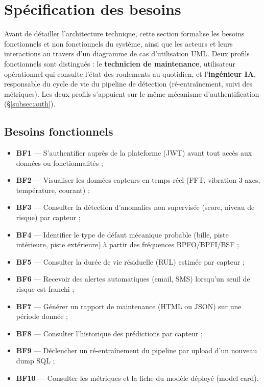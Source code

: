 \documentclass[12pt,a4paper]{report}
\begin{document}
\section{Spécification des besoins}

Avant de détailler l'architecture technique, cette section formalise les besoins
fonctionnels et non fonctionnels du système, ainsi que les acteurs et leurs interactions
au travers d'un diagramme de cas d'utilisation UML. Deux profils fonctionnels sont
distingués : le \textbf{technicien de maintenance}, utilisateur opérationnel qui consulte
l'état des roulements au quotidien, et l'\textbf{ingénieur IA}, responsable du cycle de
vie du pipeline de détection (ré-entraînement, suivi des métriques). Les deux profils
s'appuient sur le même mécanisme d'authentification (\S\ref{subsec:auth}).

\subsection{Besoins fonctionnels}

\begin{itemize}
  \item \textbf{BF1} — S'authentifier auprès de la plateforme (JWT) avant tout accès aux
    données ou fonctionnalités ;
  \item \textbf{BF2} — Visualiser les données capteurs en temps réel (FFT, vibration
    3 axes, température, courant) ;
  \item \textbf{BF3} — Consulter la détection d'anomalies non supervisée (score,
    niveau de risque) par capteur ;
  \item \textbf{BF4} — Identifier le type de défaut mécanique probable (bille, piste
    intérieure, piste extérieure) à partir des fréquences BPFO/BPFI/BSF ;
  \item \textbf{BF5} — Consulter la durée de vie résiduelle (RUL) estimée par capteur ;
  \item \textbf{BF6} — Recevoir des alertes automatiques (email, SMS) lorsqu'un seuil de
    risque est franchi ;
  \item \textbf{BF7} — Générer un rapport de maintenance (HTML ou JSON) sur une période
    donnée ;
  \item \textbf{BF8} — Consulter l'historique des prédictions par capteur ;
  \item \textbf{BF9} — Déclencher un ré-entraînement du pipeline par upload d'un nouveau
    dump SQL ;
  \item \textbf{BF10} — Consulter les métriques et la fiche du modèle déployé (model
    card).
\end{itemize}
\end{document}
